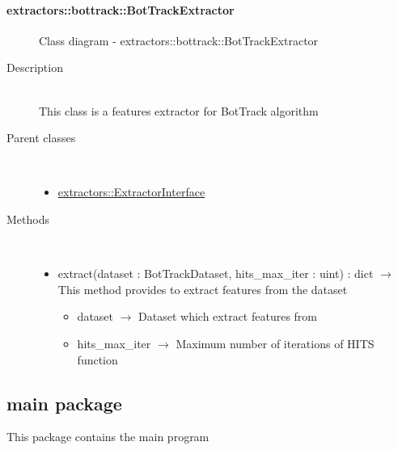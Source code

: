 \hypertarget{extractors::bottrack::BotTrackExtractor}{}
\paragraph[BotTrackExtractor]{extractors::bottrack::BotTrackExtractor}
 \hfill\begin{figure}[h]
\centering
{}
\caption{Class diagram - extractors::bottrack::BotTrackExtractor}
\end{figure}\begin{description}
\item[Description] \hfill \\
 This class is a features extractor for BotTrack algorithm
\item[Parent classes] \hfill \\
 \vspace{-1cm}
\begin{itemize}
\item \hyperlink{extractors::ExtractorInterface}{extractors::ExtractorInterface}
\end{itemize}

\item[Methods] \hfill \\
 \vspace{-1cm}
\begin{itemize}
\item extract(dataset : BotTrackDataset, hits\_max\_iter : uint) : dict $\rightarrow$ This method provides to extract features from the dataset\begin{itemize}
\item dataset $\rightarrow$ Dataset which extract features from
\item hits\_max\_iter $\rightarrow$ Maximum number of iterations of HITS function
\end{itemize}

\end{itemize}

\end{description}
\subsection{main package}
This package contains the main program

\hypertarget{main::App}{}
